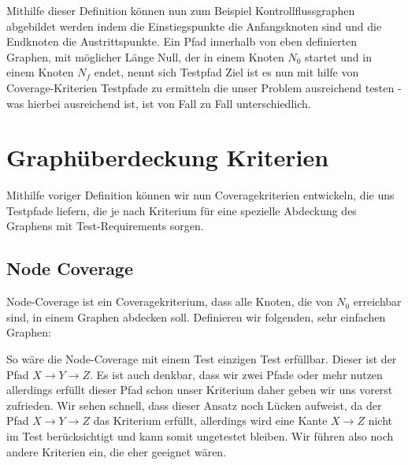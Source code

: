 Mithilfe dieser Definition können nun zum Beispiel Kontrollflussgraphen abgebildet werden indem die Einstiegspunkte die Anfangsknoten sind und die Endknoten die Austrittspunkte.
Ein Pfad innerhalb von eben definierten Graphen, mit möglicher Länge Null, der in einem Knoten $N_{0}$ startet und in einem Knoten $N_{f}$ endet, nennt sich Testpfad \cite[vgl. S. 28]{software-testing}
Ziel ist es nun mit hilfe von Coverage-Kriterien Testpfade zu ermitteln die unser Problem ausreichend testen - was hierbei ausreichend ist, ist von Fall zu Fall unterschiedlich.

\section{Graphüberdeckung Kriterien}

Mithilfe voriger Definition können wir nun Coveragekriterien entwickeln, die uns Testpfade liefern, die je nach Kriterium für eine spezielle Abdeckung
des Graphens mit Test-Requirements sorgen.

\subsection{Node Coverage}

Node-Coverage ist ein Coveragekriterium, dass alle Knoten, die von $N_{0}$ erreichbar sind, in einem Graphen abdecken soll.
Definieren wir folgenden, sehr einfachen Graphen:


So wäre die Node-Coverage mit einem Test einzigen Test erfüllbar.
Dieser ist der Pfad $X \rightarrow Y \rightarrow Z$.
Es ist auch denkbar, dass wir zwei Pfade oder mehr nutzen allerdings erfüllt dieser Pfad schon unser Kriterium daher geben wir uns vorerst zufrieden.
Wir sehen schnell, dass dieser Ansatz noch Lücken aufweist, da der Pfad $X \rightarrow Y \rightarrow Z$ das Kriterium erfüllt, allerdings wird eine Kante $X \rightarrow Z$ nicht im
Test berücksichtigt und kann somit ungetestet bleiben.
Wir führen also noch andere Kriterien ein, die eher geeignet wären.


